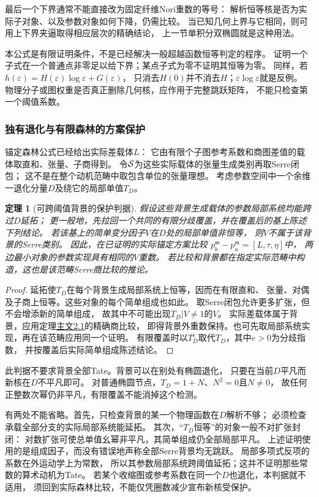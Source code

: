 \documentclass[11pt,a4paper,oneside]{ctexart}
\theoremstyle{cnplain}
\newtheorem{theorem}{定理}[section]
\theoremstyle{definition}
\theoremstyle{remark}
\numberwithin{equation}{section}
\newcommand{\otherref}[2]{\href{#1.pdf}{#2}}
\begin{document}
最后一个下界通常不能直接改为固定纤维Nori重数的等号：
解析恒等核是否为实际子对象、以及参数对象如何下降，仍需比较。
当已知几何上界与它相同，则可用上下界夹逼取得相应层次的精确结论，
上一节单积分双椭圆就是这种用法。

本公式是有限证明条件，不是已经解决一般超越函数恒等判定的程序。
证明一个子式在一个普通点非零足以给下界；某点子式为零不证明其恒等为零。
同样，若$h(\varepsilon)=H(\varepsilon)\log\varepsilon+G(\varepsilon)$，
只消去$H(0)$并不消去$H$；$\varepsilon\log\varepsilon$就是反例。
物理分子或图权重是否真正删除几何核，应作用于完整跳跃矩阵，
不能只检查第一个阈值系数。

\subsubsection{独有退化与有限森林的方案保护}
锚定森林公式已经给出实际差载体$L$：
它由有限个子图参考系数和商图差值的载体取直和、张量、子商得到。
令$\mathcal S$为这些实际载体的张量生成类别再取Serre闭包；
这不是在整个动机范畴中取包含单位的张量理想。
考虑参数空间中一个余维一退化分量$D$及绕它的局部单值$T_D$。

\begin{theorem}[可跨阈值背景的保护判据]\label{unified:thm:forestthreshold}
假设这些背景生成载体的参数局部系统均能跨过$D$延拓；
更一般地，先拉回一个共同的有限分歧覆盖，并在覆盖后的基上陈述下列结论。
若该基上的简单变分因子$V$在$D$处的局部单值非恒等，
则$V$不属于该背景的Serre类别。
因此，在已证明的实际锚定方案比较
$p_b^{\mathfrak m}-p_a^{\mathfrak m}=[L,\tau,\eta]$中，
两边最小对象的参数实现具有相同的$V$重数。
若比较和背景都在指定实际范畴中构造，这也是该范畴Serre商比较的推论。
\end{theorem}
\begin{proof}
延拓使$T_D$在每个背景生成局部系统上恒等，因而在有限直和、
张量、对偶及子商上恒等。这些对象的每个简单组成也如此。
取Serre闭包允许更多扩张，但不会增添新的简单组成，
故其中不可能出现$T_D|V\ne1$的$V$。
实际差载体属于背景，应用定理\otherref{feynman_periods_long_paper}{主文2.1}的精确商比较，
即得背景外重数保持。也可先取局部系统实现，再在该范畴应用同一个证明。
有限覆盖时以$T_D^e$取代$T_D$，其中$e>0$为分歧指数，
并按覆盖后实际简单组成陈述结论。
\end{proof}

此判据不要求背景全部Tate。背景可以在别处有椭圆退化，
只要在当前$D$平凡而新核在$D$不平凡即可。
对普通椭圆节点，$T_D=1+N$、$N^2=0$且$N\ne0$，
故任何正整数次幂仍非平凡，有限覆盖不能消掉这个检测。

有两处不能省略。首先，只检查背景的某一个物理函数在$D$解析不够；
必须检查承载全部分支的实际局部系统能延拓。
其次，“$T_D$恒等”的对象一般不对扩张封闭：
对数扩张可使总单值幺幂非平凡，其简单组成仍全部局部平凡。
上述证明使用的是组成因子，而没有错误地声称全部Serre背景均无跳跃。
局部多项式反项的系数在外运动学上为常数，
所以其参数局部系统跨阈值延拓；这并不证明那些常数的算术动机为Tate。
若某个收缩图或参考系数在同一个$D$也退化，本判据就不适用，
须回到实际森林比较，不能仅凭圈数减少宣布新核受保护。
\end{document}
